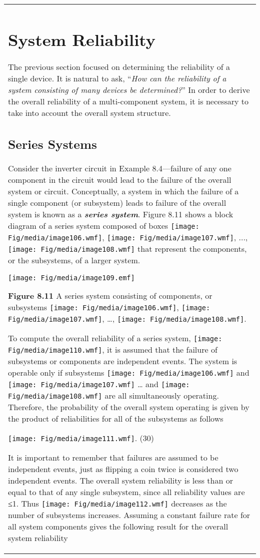 \begin{table}
\begin{tabular}{m{15cm}|}
\section{System Reliability}\label{system-reliability-1}

The previous section focused on determining the reliability of a single
device. It is natural to ask, ``\emph{How can the reliability of a
system consisting of many devices be determined?}'' In order to derive
the overall reliability of a multi-component system, it is necessary to
take into account the overall system structure.

\subsection{Series Systems}\label{series-systems}

Consider the inverter circuit in Example 8.4---failure of any one
component in the circuit would lead to the failure of the overall system
or circuit. Conceptually, a system in which the failure of a single
component (or subsystem) leads to failure of the overall system is known
as a \emph{\textbf{series system}}. Figure 8.11 shows a block diagram of
a series system composed of boxes
\texttt{[image: Fig/media/image106.wmf]},
\texttt{[image: Fig/media/image107.wmf]}, ...,
\texttt{[image: Fig/media/image108.wmf]} that represent the components,
or the subsystems, of a larger system.

\texttt{[image: Fig/media/image109.emf]}

\textbf{Figure 8.11} A series system consisting of components, or
subsystems \texttt{[image: Fig/media/image106.wmf]},
\texttt{[image: Fig/media/image107.wmf]}, \ldots,
\texttt{[image: Fig/media/image108.wmf]}.

To compute the overall reliability of a series system,
\texttt{[image: Fig/media/image110.wmf]}, it is assumed that the failure
of subsystems or components are independent events. The system is
operable only if subsystems \texttt{[image: Fig/media/image106.wmf]} and
\texttt{[image: Fig/media/image107.wmf]} \ldots{} and
\texttt{[image: Fig/media/image108.wmf]} are all simultaneously
operating. Therefore, the probability of the overall system operating is
given by the product of reliabilities for all of the subsystems as
follows

\texttt{[image: Fig/media/image111.wmf]}. (30)

It is important to remember that failures are assumed to be independent
events, just as flipping a coin twice is considered two independent
events. The overall system reliability is less than or equal to that of
any single subsystem, since all reliability values are ≤1. Thus
\texttt{[image: Fig/media/image112.wmf]} decreases as the number of
subsystems increases. Assuming a constant failure rate for all system
components gives the following result for the overall system reliability


\end{tabular}
\end{table}
